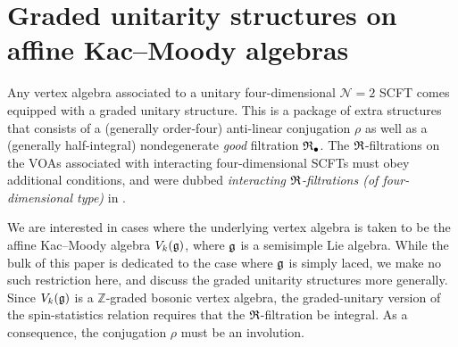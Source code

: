 \section{Graded unitarity structures on affine Kac--Moody algebras} \label{sec:grunitstructures}
Any vertex algebra associated to a unitary four-dimensional $\mathcal{N}=2$ SCFT comes equipped with a graded unitary structure. This is a package of extra structures that consists of a (generally order-four) anti-linear conjugation $\rho$ as well as a (generally half-integral) nondegenerate \emph{good} filtration $\mathfrak{R}_\bullet$. The $\mathfrak{R}$-filtrations on the VOAs associated with interacting four-dimensional SCFTs must obey additional conditions, and were dubbed \textit{interacting $\mathfrak{R}$-filtrations (of four-dimensional type)} in \cite{ArabiArdehali:2025fad}. 

We are interested in cases where the underlying vertex algebra is taken to be the affine Kac--Moody algebra $V_k(\mathfrak{g})$, where $\mathfrak{g}$ is a semisimple Lie algebra. While the bulk of this paper is dedicated to the case where $\mathfrak{g}$ is simply laced, we make no such restriction here, and discuss the graded unitarity structures more generally. Since $V_k(\mathfrak{g})$ is a $\mathbb{Z}$-graded bosonic vertex algebra, the graded-unitary version of the spin-statistics relation \cite{Beem:2025guj} requires that the $\mathfrak{R}$-filtration be integral. As a consequence, the conjugation $\rho$ must be an involution.

